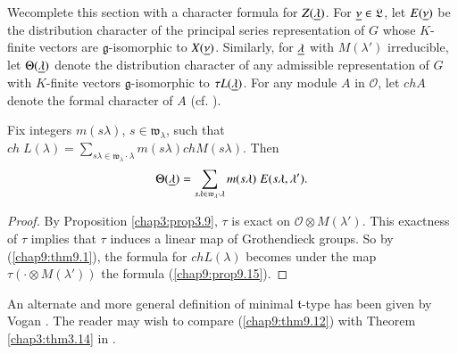 We\pageoriginale complete this section with a character formula for
$Z(\underline{\lambda})$. For $\underline{\nu} \in \mathfrak{L}$, let $E(\underline{\nu})$ be
the distribution character of the principal series representation of
$G$ whose $K$-finite vectors are $\mathfrak{g}$-isomorphic to
$X(\underline{\nu})$. Similarly, for $\underline{\lambda}$ with $M(\lambda')$
irreducible, let $\Theta(\underline{\lambda})$ denote the distribution
character of any admissible representation of $G$ with $K$-finite
vectors $\mathfrak{g}$-isomorphic to $\tau L(\underline{\lambda})$. For any
module $A$ in $\mathscr{O}$, let $chA$ denote the formal character of
$A$ (cf. \cite{key24}). 

\begin{prop}\label{chap9:prop9.15}
Fix integers $m(s\lambda)$, $s \in \mathfrak{w}_\lambda$, such that
$ch \; L(\lambda) = \sum\limits_{s\lambda \in \mathfrak{w}_\lambda
  \cdot \lambda} m(s\lambda) ch M(s\lambda)$. Then 
$$
\Theta (\underline{\lambda}) = \sum\limits_{s\lambda \in \mathfrak{w}_\lambda
  \cdot \lambda} m (s\lambda) \; E(s\lambda, \lambda').
$$
\end{prop}

\begin{proof}
By Proposition \ref{chap3:prop3.9}, $\tau$ is exact on $\mathscr{O} \otimes
M(\lambda')$. This exactness of $\tau$ implies that $\tau$ induces a
linear map of Grothendieck groups. So by (\ref{chap9:thm9.1}), the formula for $ch
L(\lambda)$ becomes under the map $\tau (\cdot \otimes M(\lambda'))$
the formula (\ref{chap9:prop9.15}). 
\end{proof}

An alternate and more general definition of minimal
$\mathfrak{t}$-type has been given by Vogan \cite{key34}. The reader
may wish to compare (\ref{chap9:thm9.12}) with Theorem
\ref{chap3:thm3.14} in \cite{key34}.  
